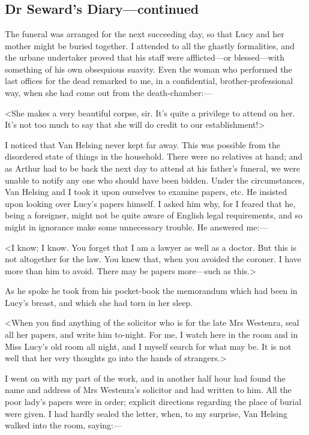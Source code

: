 \chapter[Chapter \thechapter]{}

\section{Dr Seward's Diary—continued}
The funeral was arranged for the next succeeding day, so that Lucy and her mother might be buried together. I attended to all the ghastly formalities, and the urbane undertaker proved that his staff were afflicted—or blessed—with something of his own obsequious suavity. Even the woman who performed the last offices for the dead remarked to me, in a confidential, brother-professional way, when she had come out from the death-chamber:—

<She makes a very beautiful corpse, sir. It's quite a privilege to attend on her. It's not too much to say that she will do credit to our establishment!>

I noticed that Van Helsing never kept far away. This was possible from the disordered state of things in the household. There were no relatives at hand; and as Arthur had to be back the next day to attend at his father's funeral, we were unable to notify any one who should have been bidden. Under the circumstances, Van Helsing and I took it upon ourselves to examine papers, etc. He insisted upon looking over Lucy's papers himself. I asked him why, for I feared that he, being a foreigner, might not be quite aware of English legal requirements, and so might in ignorance make some unnecessary trouble. He answered me:—

<I know; I know. You forget that I am a lawyer as well as a doctor. But this is not altogether for the law. You knew that, when you avoided the coroner. I have more than him to avoid. There may be papers more—such as this.>

As he spoke he took from his pocket-book the memorandum which had been in Lucy's breast, and which she had torn in her sleep.

<When you find anything of the solicitor who is for the late Mrs Westenra, seal all her papers, and write him to-night. For me, I watch here in the room and in Miss Lucy's old room all night, and I myself search for what may be. It is not well that her very thoughts go into the hands of strangers.>

I went on with my part of the work, and in another half hour had found the name and address of Mrs Westenra's solicitor and had written to him. All the poor lady's papers were in order; explicit directions regarding the place of burial were given. I had hardly sealed the letter, when, to my surprise, Van Helsing walked into the room, saying:—

